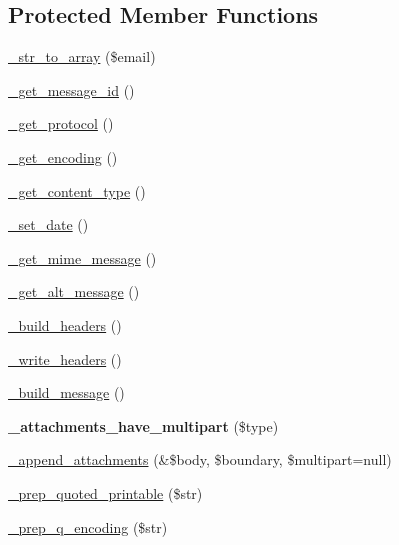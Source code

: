 \subsection*{Protected Member Functions}
\begin{DoxyCompactItemize}
\item 
\mbox{\hyperlink{class_c_i___email_a5dd90c39949daaf68aa43875dc9073a3}{\+\_\+str\+\_\+to\+\_\+array}} (\$email)
\item 
\mbox{\hyperlink{class_c_i___email_a32a7b05f36310ca1e06a8c98d063b973}{\+\_\+get\+\_\+message\+\_\+id}} ()
\item 
\mbox{\hyperlink{class_c_i___email_a24471eb32b0f5b27c70cc2a7214db28d}{\+\_\+get\+\_\+protocol}} ()
\item 
\mbox{\hyperlink{class_c_i___email_a895a792c44ccbf4675899347b9a492fc}{\+\_\+get\+\_\+encoding}} ()
\item 
\mbox{\hyperlink{class_c_i___email_a992fa75b33c57b4691e4c817ab4bc6fe}{\+\_\+get\+\_\+content\+\_\+type}} ()
\item 
\mbox{\hyperlink{class_c_i___email_a5cbcc8cbc5b762d4a39ce675c3b9927a}{\+\_\+set\+\_\+date}} ()
\item 
\mbox{\hyperlink{class_c_i___email_a5adf7d29a46958ec8ad14b19afcd2115}{\+\_\+get\+\_\+mime\+\_\+message}} ()
\item 
\mbox{\hyperlink{class_c_i___email_a50b4effe2019c1834101de37c0e39829}{\+\_\+get\+\_\+alt\+\_\+message}} ()
\item 
\mbox{\hyperlink{class_c_i___email_a673041044004b76b58c11921285c004e}{\+\_\+build\+\_\+headers}} ()
\item 
\mbox{\hyperlink{class_c_i___email_a5db89d2d846095177141a8ed6df3ae33}{\+\_\+write\+\_\+headers}} ()
\item 
\mbox{\hyperlink{class_c_i___email_a720eb0e118e2b4b9d7fb77e4ddb95256}{\+\_\+build\+\_\+message}} ()
\item 
\mbox{\label{class_c_i___email_afef66f0f5384c9bd30744b7a20445fc9}} 
{\bfseries \+\_\+attachments\+\_\+have\+\_\+multipart} (\$type)
\item 
\mbox{\hyperlink{class_c_i___email_acc9e8b3fa2bd57fbf824d0841d24dde7}{\+\_\+append\+\_\+attachments}} (\&\$body, \$boundary, \$multipart=null)
\item 
\mbox{\hyperlink{class_c_i___email_ac3c8b2a557c9f0a69c4025f00dbfbe3a}{\+\_\+prep\+\_\+quoted\+\_\+printable}} (\$str)
\item 
\mbox{\hyperlink{class_c_i___email_a65f3f89ca5e4fabbcab14dfff767c62f}{\+\_\+prep\+\_\+q\+\_\+encoding}} (\$str)

\end{DoxyCompactItemize}
